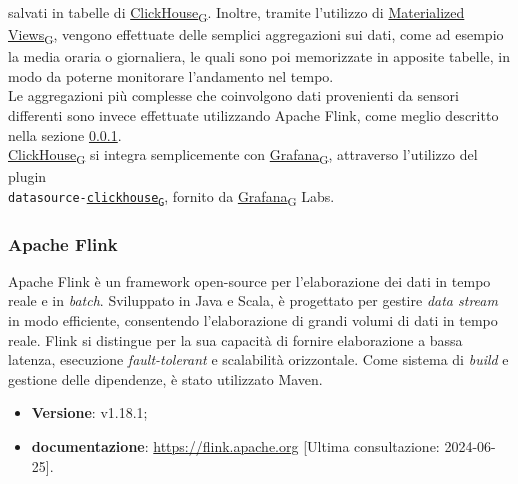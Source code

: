 salvati in tabelle di \href{https://7last.github.io/docs/pb/documentazione-interna/glossario\#clickhouse}{ClickHouse\textsubscript{G}}.
Inoltre, tramite l'utilizzo di \href{https://7last.github.io/docs/pb/documentazione-interna/glossario\#materialized-view}{Materialized Views\textsubscript{G}}, vengono effettuate delle semplici aggregazioni sui dati, come ad esempio la media oraria o giornaliera, le quali sono poi memorizzate in apposite tabelle,
in modo da poterne monitorare l'andamento nel tempo.\\
Le aggregazioni più complesse che coinvolgono dati provenienti da sensori differenti sono invece effettuate utilizzando Apache Flink, come meglio descritto nella sezione \ref{sec:flink}.\\
\href{https://7last.github.io/docs/pb/documentazione-interna/glossario\#clickhouse}{ClickHouse\textsubscript{G}} si integra semplicemente con \href{https://7last.github.io/docs/pb/documentazione-interna/glossario\#grafana}{Grafana\textsubscript{G}}, attraverso l'utilizzo del plugin \\
\texttt{datasource-\href{https://7last.github.io/docs/pb/documentazione-interna/glossario\#clickhouse}{clickhouse\textsubscript{G}}}, fornito da \href{https://7last.github.io/docs/pb/documentazione-interna/glossario\#grafana}{Grafana\textsubscript{G}} Labs.

\subsubsection{Apache Flink} \label{sec:flink}
Apache Flink è un framework open-source per l'elaborazione dei dati in tempo reale e in \textit{batch}.
Sviluppato in Java e Scala, è progettato per gestire \textit{data stream} in modo efficiente, consentendo l'elaborazione di grandi volumi di dati in tempo reale.
Flink si distingue per la sua capacità di fornire elaborazione a bassa latenza, esecuzione \textit{fault-tolerant} e scalabilità orizzontale.
Come sistema di \textit{build} e gestione delle dipendenze, è stato utilizzato Maven.

\begin{itemize}
	\item \textbf{Versione}: v1.18.1;
	\item \textbf{documentazione}: \url{https://flink.apache.org} [Ultima consultazione: 2024-06-25].
\end{itemize}

